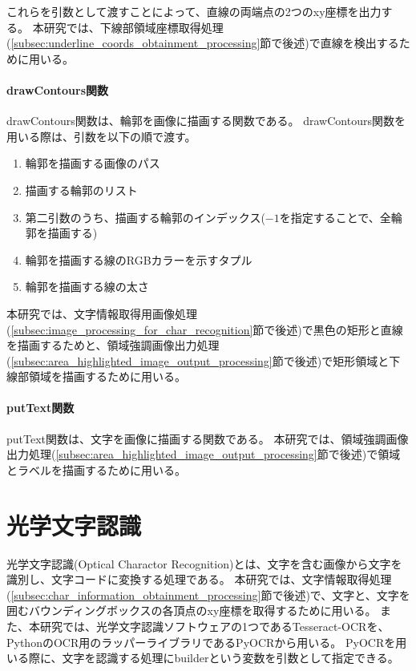 これらを引数として渡すことによって、直線の両端点の2つのxy座標を出力する。
本研究では、下線部領域座標取得処理(\ref{subsec:underline_coords_obtainment_processing}節で後述)で直線を検出するために用いる。

\paragraph{drawContours関数}
drawContours関数は、輪郭を画像に描画する関数である。
drawContours関数を用いる際は、引数を以下の順で渡す\cite{輪郭描画}。
\begin{enumerate}
	\item 輪郭を描画する画像のパス
	\item 描画する輪郭のリスト
	\item 第二引数のうち、描画する輪郭のインデックス($-1$を指定することで、全輪郭を描画する)
	\item 輪郭を描画する線のRGBカラーを示すタプル
	\item 輪郭を描画する線の太さ
\end{enumerate}
本研究では、文字情報取得用画像処理(\ref{subsec:image_processing_for_char_recognition}節で後述)で黒色の矩形と直線を描画するためと、領域強調画像出力処理(\ref{subsec:area_highlighted_image_output_processing}節で後述)で矩形領域と下線部領域を描画するために用いる。

\paragraph{putText関数}
putText関数は、文字を画像に描画する関数である。
本研究では、領域強調画像出力処理(\ref{subsec:area_highlighted_image_output_processing}節で後述)で領域とラベルを描画するために用いる。

\section{光学文字認識}\label{sec:Optical-Charactor-Recognition}
光学文字認識(Optical Charactor Recognition)とは、文字を含む画像から文字を識別し、文字コードに変換する処理である\cite{光学文字認識}。
本研究では、文字情報取得処理(\ref{subsec:char_information_obtainment_processing}節で後述)で、文字と、文字を囲むバウンディングボックスの各頂点のxy座標を取得するために用いる。
また、本研究では、光学文字認識ソフトウェア\cite{光学文字認識ソフトウェア}の1つであるTesseract-OCR\cite{Tesseract-OCR}を、PythonのOCR用のラッパーライブラリであるPyOCR\cite{PyOCR}から用いる。
PyOCRを用いる際に、文字を認識する処理にbuilderという変数を引数として指定できる。

